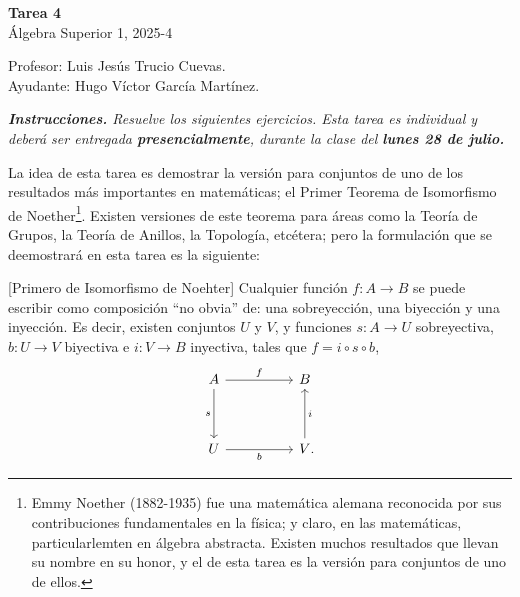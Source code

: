 \documentclass[letterpaper,DIV=14,headsepline,12pt]{scrartcl}
\begin{document}
    \begin{center}
        {\fontsize{30}{60}\rmfamily \textbf{Tarea 4}} \\ \vspace{.2cm} Álgebra
        Superior 1, 2025-4
    \end{center}
    \begin{flushright}
        \footnotesize \hfill Profesor: Luis Jesús Trucio Cuevas.\\
        \hfill Ayudante: Hugo Víctor García Martínez.
    \end{flushright}

    \noindent\textit{\textbf{Instrucciones.} Resuelve los siguientes ejercicios.
    Esta tarea es individual y deberá ser entregada \textbf{presencialmente},
    durante la clase del \textbf{lunes 28 de julio.} \vspace{.4cm}}

    La idea de esta tarea es demostrar la versión para conjuntos de uno de los
    resultados más importantes en matemáticas; el Primer Teorema de Isomorfismo
    de Noether\footnote{Emmy Noether (1882-1935) fue una matemática alemana
    reconocida por sus contribuciones fundamentales en la física; y claro, en
    las matemáticas, particularlemten en álgebra abstracta. Existen muchos
    resultados que llevan su nombre en su honor, y el de esta tarea es la
    versión para conjuntos de uno de ellos.}. Existen versiones de este teorema
    para áreas como la Teoría de Grupos, la Teoría de Anillos, la Topología,
    etcétera; pero la formulación que se deemostrará en esta tarea es la
    siguiente:

    \begin{teorema}\label{teo:primero}[Primero de Isomorfismo de Noehter]
        Cualquier función $f\colon A \to B$ se puede escribir como composición ``no obvia''
        de: una sobreyección, una biyección y una inyección. Es decir, existen
        conjuntos $U$ y $V$, y funciones $s\colon A \to U$ sobreyectiva, $b\colon U \to V$
        biyectiva e $i\colon V \to B$ inyectiva, tales que $f = i \circ s \circ b$,
        \begin{equation}\label{eq:obj}
            \begin{tikzcd}
            A && B \\
            \\
            U && V\mathrlap{.}
            \arrow["f", from=1-1, to=1-3]
            \arrow["s"', from=1-1, to=3-1]
            \arrow["b"', from=3-1, to=3-3]
            \arrow["i"', from=3-3, to=1-3]
        \end{tikzcd}
        \end{equation}
    \end{teorema}
\end{document}
